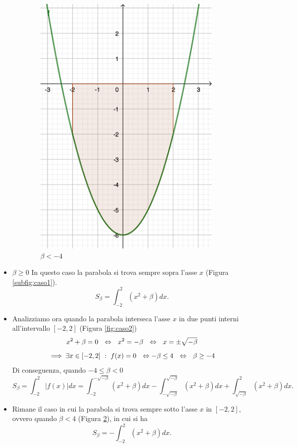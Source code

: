 \documentclass{article}
\begin{document}
\begin{enumerate}[label=\textbf{Esercizio 11.\arabic*.},itemindent=*]
\begin{figure}[h]
\begin{subfigure}{0.27\textwidth}
        \includegraphics[width=.9\textwidth]{src/caso3.png}
        \caption{$\beta<-4$}
        \label{fig:caso3}
    \end{subfigure}
    \caption{}
\end{figure}
\begin{itemize}
    \item $\beta\geq0$ In questo caso la parabola si trova sempre sopra l'asse $x$ (Figura \ref{subfig:caso1}). \[S_\beta=\int_{-2}^2(x^2+\beta)dx.\]
    \item Analizziamo ora quando la parabola interseca l'asse $x$ in due punti interni all'intervallo $[-2,2]$ (Figura \ref{fig:caso2})
    \[x^2+\beta=0~~\Leftrightarrow~~x^2=-\beta~~\Leftrightarrow~~x=\pm\sqrt{-\beta}\]
    \[\implies \exists x \in [-2,2]~:~f(x)=0~~\Leftrightarrow -\beta\leq 4~~\Leftrightarrow~~\beta\geq -4\]
    Di conseguenza, quando $-4\leq \beta<0$
    \[S_\beta=\int_{-2}^{2}|f(x)|dx=\int_{-2}^{-\sqrt{-\beta}}(x^2+\beta)dx -\int_{-\sqrt{-\beta}}^{\sqrt{-\beta}}(x^2+\beta)dx+\int_{\sqrt{-\beta}}^{2}(x^2+\beta)dx.\]
    \item Rimane il caso in cui la parabola si trova sempre sotto l'asse $x$ in $[-2,2]$, ovvero quando $\beta<4$ (Figura \ref{fig:caso3}), in cui si ha
    \[S_\beta=-\int_{-2}^2(x^2+\beta)dx.\]
\end{itemize}


\end{enumerate}
\end{document}
